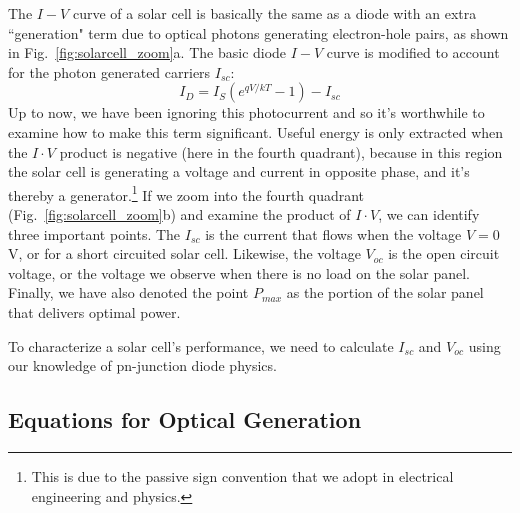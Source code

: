 The $I-V$ curve of a solar cell is basically the same as a diode with an extra ``generation" term  due to optical photons generating electron-hole pairs, as shown in Fig.~\ref{fig:solarcell_zoom}a.  The basic diode $I-V$ curve is modified to account for the photon generated carriers $I_{sc}$:
%
\begin{equation} 
	I_D = I_S (e^{qV/kT} - 1) - I_{sc}
\end{equation}
%
Up to now, we have been ignoring this photocurrent and so it's worthwhile to examine how to make this term significant.  Useful energy is only extracted when the $I\cdot V$ product is negative (here in the fourth quadrant), because in this region the solar cell is generating a voltage and current in opposite phase, and it's thereby a generator.\footnote{This is due to the passive sign convention that we adopt in electrical engineering and physics.}  If we zoom into the fourth quadrant (Fig.~\ref{fig:solarcell_zoom}b) and examine the product of $I\cdot V$, we can identify three important points.  The $I_{sc}$ is the current that flows when the voltage $V = 0$V, or for a short circuited solar cell.  Likewise, the voltage $V_{oc}$ is the open circuit voltage, or the voltage we observe when there is no load on the solar panel.  Finally, we have also denoted the point $P_{max}$ as the portion of the solar panel that delivers optimal power.

To characterize a solar cell's performance, we need to calculate $I_{sc}$ and $V_{oc}$ using our knowledge of pn-junction diode physics.






\subsection{Equations for Optical Generation}

